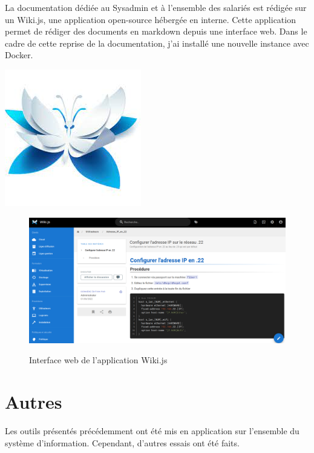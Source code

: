 \documentclass[12pt, a4paper, twoside]{article}
\begin{document}
\noindent%
\begin{minipage}{.75\textwidth}%
La documentation dédiée au Sysadmin et à l'ensemble des salariés est rédigée sur un Wiki.js, une application open-source hébergée en interne. 
Cette application permet de rédiger des documents en markdown depuis une interface web. 
Dans le cadre de cette reprise de la documentation, j'ai installé une nouvelle instance avec Docker.

\end{minipage}%
\hfill
\begin{minipage}{.25\textwidth}%
\begin{center}
\includegraphics[width=.5\textwidth]{src/logo_wikijs.jpeg}
\end{center}
\end{minipage}%

\begin{figure}[!ht]
    \centering
    \includegraphics[width=\textwidth]{src/interface_wikijs.png}
    \label{fig:interface_wikijs}
    \caption{Interface web de l'application Wiki.js}
\end{figure}

\newpage
\section{Autres}
Les outils présentés précédemment ont été mis en application sur l'ensemble du système d'information. 
Cependant, d'autres essais ont été faits.
\end{document}

